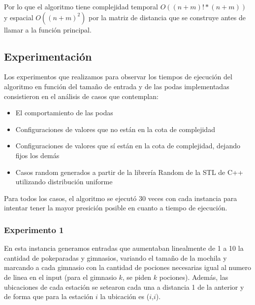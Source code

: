       Por lo que el algoritmo tiene complejidad temporal $O((n+m)! * (n+m))$ y espacial $O((n+m)^2)$ por la matriz de distancia que se construye antes de llamar a la función principal.


    \subsection{Experimentación}

      Los experimentos que realizamos para observar los tiempos de ejecución del algoritmo en función del tamaño de entrada y de las podas implementadas consistieron en el análisis de casos que contemplan:

      \begin{itemize}
        \item El comportamiento de las podas
        \item Configuraciones de valores que no están en la cota de complejidad
        \item Configuraciones de valores que sí están en la cota de complejidad, dejando fijos los demás
        \item Casos random generados a partir de la librería Random de la STL de C++ utilizando distribución uniforme
      \end{itemize}

      Para todos los casos, el algoritmo se ejecutó 30 veces con cada instancia para intentar tener la mayor presición posible en cuanto a tiempo de ejecución.

      \subsubsection{Experimento 1}
      En esta instancia generamos entradas que aumentaban linealmente de 1 a 10 la cantidad de pokeparadas y gimnasios, variando el tamaño de la mochila y marcando a cada gimnasio con la cantidad de pociones necesarias igual al numero de linea en el input (para el gimnasio $k$, se piden $k$ pociones). Además, las ubicaciones de cada estación se setearon cada una a distancia 1 de la anterior y de forma que para la estación $i$ la ubicación es ($i$,$i$).

